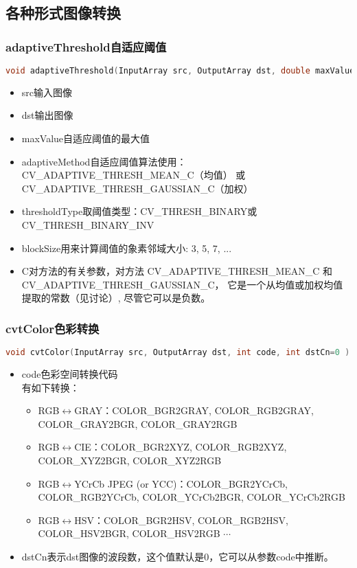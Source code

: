 \documentclass[12pt]{article}
\begin{document}
\subsection{各种形式图像转换}

\subsubsection{adaptiveThreshold自适应阈值}
\begin{lstlisting}[language=c++]
void adaptiveThreshold(InputArray src, OutputArray dst, double maxValue, int adaptiveMethod, int thresholdType, int blockSize, double C)
\end{lstlisting}
\begin{itemize}
\item src输入图像
\item dst输出图像
\item maxValue自适应阈值的最大值
\item adaptiveMethod自适应阈值算法使用：CV\_ADAPTIVE\_THRESH\_MEAN\_C（均值） 或 CV\_ADAPTIVE\_THRESH\_GAUSSIAN\_C（加权）
\item thresholdType取阈值类型：CV\_THRESH\_BINARY或CV\_THRESH\_BINARY\_INV
\item blockSize用来计算阈值的象素邻域大小: 3, 5, 7, ...
\item C对方法的有关参数，对方法 CV\_ADAPTIVE\_THRESH\_MEAN\_C 和 CV\_ADAPTIVE\_THRESH\_GAUSSIAN\_C， 它是一个从均值或加权均值提取的常数（见讨论）, 尽管它可以是负数。
\end{itemize}

\subsubsection{cvtColor色彩转换}
\begin{lstlisting}[language=c++]
void cvtColor(InputArray src, OutputArray dst, int code, int dstCn=0 )
\end{lstlisting}
\begin{itemize}
\item code色彩空间转换代码\\
有如下转换：
	\begin{itemize}
	\item RGB$\leftrightarrow$GRAY：COLOR\_BGR2GRAY, COLOR\_RGB2GRAY, COLOR\_GRAY2BGR, COLOR\_GRAY2RGB
	\item RGB$\leftrightarrow$CIE：COLOR\_BGR2XYZ, COLOR\_RGB2XYZ, COLOR\_XYZ2BGR, COLOR\_XYZ2RGB
	\item RGB$\leftrightarrow$YCrCb JPEG (or YCC)：COLOR\_BGR2YCrCb, COLOR\_RGB2YCrCb, COLOR\_YCrCb2BGR, COLOR\_YCrCb2RGB
	\item RGB$\leftrightarrow$HSV：COLOR\_BGR2HSV, COLOR\_RGB2HSV, COLOR\_HSV2BGR, COLOR\_HSV2RGB
	$\cdots$
	\end{itemize}
\item dstCn表示dst图像的波段数，这个值默认是0，它可以从参数code中推断。 
\end{itemize}
\end{document}
